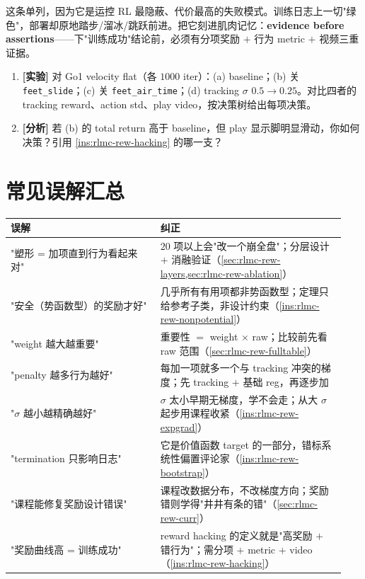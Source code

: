 \begin{pitfall}["奖励曲线高 = 行为好"是最危险的错觉]
这条单列，因为它是运控 RL 最隐蔽、代价最高的失败模式。训练日志上一切"绿色"，部署却原地踏步/溜冰/跳跃前进。把它刻进肌肉记忆：\textbf{evidence before assertions}——下"训练成功"结论前，必须有分项奖励 $+$ 行为 metric $+$ 视频三重证据。
\end{pitfall}

\begin{practice}[练习·消融]
\begin{enumerate}
  \item \textbf{[实验]} 对 Go1 velocity flat（各 $1000$ iter）：(a) baseline；(b) 关 \verb|feet_slide|；(c) 关 \verb|feet_air_time|；(d) tracking $\sigma$ $0.5\to0.25$。对比四者的 tracking reward、action std、play video，按决策树给出每项决策。
  \item \textbf{[分析]} 若 (b) 的 total return 高于 baseline，但 play 显示脚明显滑动，你如何决策？引用 \cref{ins:rlmc-rew-hacking} 的哪一支？
\end{enumerate}
\end{practice}

\section{常见误解汇总}
\label{sec:rlmc-rew-misconceptions}

\begin{center}
\small
\begin{tabular}{@{}p{0.42\linewidth}p{0.52\linewidth}@{}}
\toprule
误解 & 纠正 \\
\midrule
"塑形 = 加项直到行为看起来对" & $20$ 项以上会"改一个崩全盘"；分层设计 $+$ 消融验证（\cref{sec:rlmc-rew-layers,sec:rlmc-rew-ablation}） \\
"安全（势函数型）的奖励才好" & 几乎所有有用项都非势函数型；定理只给参考子类，非设计约束（\cref{ins:rlmc-rew-nonpotential}） \\
"weight 越大越重要" & 重要性 $=$ weight $\times$ raw；比较前先看 raw 范围（\cref{sec:rlmc-rew-fulltable}） \\
"penalty 越多行为越好" & 每加一项就多一个与 tracking 冲突的梯度；先 tracking $+$ 基础 reg，再逐步加 \\
"$\sigma$ 越小越精确越好" & $\sigma$ 太小早期无梯度，学不会走；从大 $\sigma$ 起步用课程收紧（\cref{ins:rlmc-rew-expgrad}） \\
"termination 只影响日志" & 它是价值函数 target 的一部分，错标系统性偏置评论家（\cref{ins:rlmc-rew-bootstrap}） \\
"课程能修复奖励设计错误" & 课程改数据分布，不改梯度方向；奖励错则学得"井井有条的错"（\cref{sec:rlmc-rew-curr}） \\
"奖励曲线高 = 训练成功" & reward hacking 的定义就是"高奖励 $+$ 错行为"；需分项 $+$ metric $+$ video（\cref{ins:rlmc-rew-hacking}） \\
\bottomrule
\end{tabular}
\end{center}

